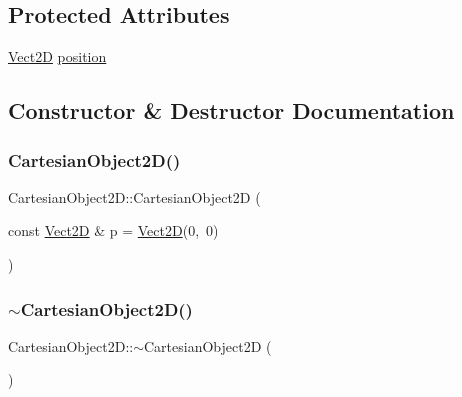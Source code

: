 \subsection*{Protected Attributes}
\begin{DoxyCompactItemize}
\item 
\hyperlink{classVect2D}{Vect2D} \hyperlink{classCartesianObject2D_ae02ec6ed11f9bfc0c748da033d6a32f9_ae02ec6ed11f9bfc0c748da033d6a32f9}{position}
\end{DoxyCompactItemize}


\subsection{Constructor \& Destructor Documentation}
\mbox{\label{classCartesianObject2D_a4e32dae738f975ef1d323b2810fc0b72_a4e32dae738f975ef1d323b2810fc0b72}} 
\subsubsection{\texorpdfstring{Cartesian\+Object2\+D()}{CartesianObject2D()}}
{\footnotesize\ttfamily Cartesian\+Object2\+D\+::\+Cartesian\+Object2D (\begin{DoxyParamCaption}\item[{const \hyperlink{classVect2D}{Vect2D} \&}]{p = {\ttfamily \hyperlink{classVect2D}{Vect2D}(0,~0)} }\end{DoxyParamCaption})}

\mbox{\label{classCartesianObject2D_a16f2f813e178802ec316fcedae39f7af_a16f2f813e178802ec316fcedae39f7af}} 
\subsubsection{\texorpdfstring{$\sim$\+Cartesian\+Object2\+D()}{~CartesianObject2D()}}
{\footnotesize\ttfamily Cartesian\+Object2\+D\+::$\sim$\+Cartesian\+Object2D (\begin{DoxyParamCaption}{ }\end{DoxyParamCaption})\hspace{0.3cm}{\ttfamily [virtual]}}



